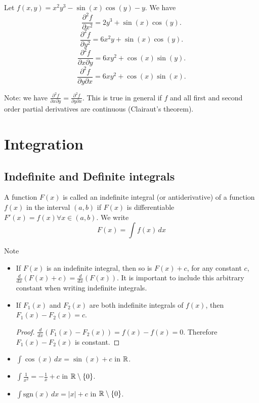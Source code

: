 \documentclass[10pt, a4paper]{article}
\begin{document}
\begin{example}
    Let $f(x, y) = x ^ 2 y ^ 3 - \sin(x)\cos(y) - y$.
    We have 
    \[
    \frac{\partial ^ 2 f}{\partial x ^ 2} = 2y ^ 3 + \sin(x)\cos(y).
    \]
    \[
    \frac{\partial ^ 2 f}{\partial y ^ 2} = 6x ^ 2 y + \sin(x)\cos(y).
    \]
    \[
    \frac{\partial ^ 2 f}{\partial x \partial y} = 6xy ^ 2 + \cos(x)\sin(y).
    \]
    \[
    \frac{\partial ^ 2 f}{\partial y \partial x} = 6xy ^ 2 + \cos(x)\sin(x).
    \]
\end{example}

Note: we have $\frac{\partial ^ 2 f}{\partial x \partial y} = \frac{\partial ^ 2 f}{\partial y \partial x}$.
This is true in general if $f$ and all first and second order partial derivatives are continuous (Clairaut's theorem).

\newpage

\section{Integration}

\subsection{Indefinite and Definite integrals}
\begin{definition}
    A function $F(x)$ is called an indefinite integral (or antiderivative) of a function $f(x)$ in the interval $(a, b)$ if $F(x)$ is differentiable
    $F'(x) = f(x) \forall x \in (a, b)$.
    We write
    \[
    F(x) = \int f(x)\,dx
    \]
\end{definition}

Note
\begin{itemize}
    \item If $F(x)$ is an indefinite integral,
    then so is $F(x) + c$,
    for any constant $c$,
    $\frac{d}{dx}(F(x) + c) = \frac{d}{dx}(F(x))$.
    It is important to include this arbitrary constant when writing indefinite integrals.
    \item If $F_1(x)$ and $F_2(x)$ are both indefinite integrals of $f(x)$,
    then $F_1(x) - F_2(x) = c$.
    \begin{proof}
        $\frac{d}{dx}(F_1(x) - F_2(x)) = f(x) - f(x) = 0$.
        Therefore $F_1(x) - F_2(x)$ is constant.
    \end{proof}
\end{itemize}

\begin{example}\phantom{}
    \begin{itemize}
        \item $\int\cos(x)\,dx = \sin(x) + c$ in $\mathbb{R}$.
        \item $\int\frac{1}{x ^ 2} = -\frac{1}{x} + c$ in $\mathbb{R} \setminus\{0\}$.
        \item $\int\mathrm{sgn}(x)\,dx = |x| + c$ in $\mathbb{R} \setminus \{0\}$.
    \end{itemize}
\end{example}
\end{document}
